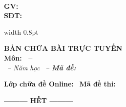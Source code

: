 \documentclass[11pt,a4paper]{article}
\begin{document}
\noindent
\begin{tcolorbox}[
    colback=blue!2!white,
    colframe=blue!80!black,
    arc=3mm,
    boxrule=1pt,
    left=6pt, right=6pt, top=5pt, bottom=5pt
]
\begin{minipage}[c]{0.43\linewidth}
\centering
{\large\bfseries\color{blue!85!black} \brandname}\\[3pt]
\textbf{GV: \giaovien}\\[2pt]
\textbf{SĐT: \sdt}
\end{minipage}%
\hfill
{\color{blue!60!black}\vrule width 0.8pt}%
\hfill
\begin{minipage}[c]{0.54\linewidth}
\centering
{\large\bfseries\color{red!85!black} BẢN CHỮA BÀI TRỰC TUYẾN}\\[2pt]
\textbf{Môn: \monhoc\ifx\tentruong\empty\else\ -- \tentruong\fi}\\[2pt]
\textit{\tenkythi\ -- Năm học \namhoc\ -- \textbf{Mã đề: \made}}
\end{minipage}

\vspace{3pt}
\tcbline
\vspace{2pt}
\noindent
\rule{0pt}{11pt}\textbf{Lớp chữa đề Online:} \dotfill\ \textbf{Mã đề thi: \made}
\end{tcolorbox}
\vspace{0.15cm}



\vspace{0.4cm}
\begin{center}
	\textbf{--------- HẾT ---------}
\end{center}
\end{document}
